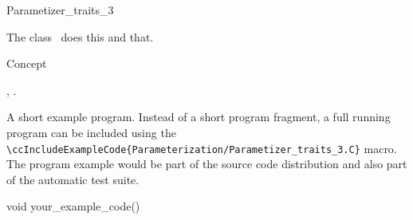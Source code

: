 

\begin{ccRefClass}{Parametizer_traits_3}  %


\ccDefinition
  
The class \ccRefName\ does this and that.


\ccIsModel

Concept

\ccTypes


\ccCreation
{}  %


\ccOperations


\ccSeeAlso

,
.

\ccExample

A short example program.
Instead of a short program fragment, a full running program can be
included using the 
\verb|\ccIncludeExampleCode{Parameterization/Parametizer_traits_3.C}| 
macro. The program example would be part of the source code distribution and
also part of the automatic test suite.

\begin{ccExampleCode}
void your_example_code() {
}
\end{ccExampleCode}


\end{ccRefClass}


